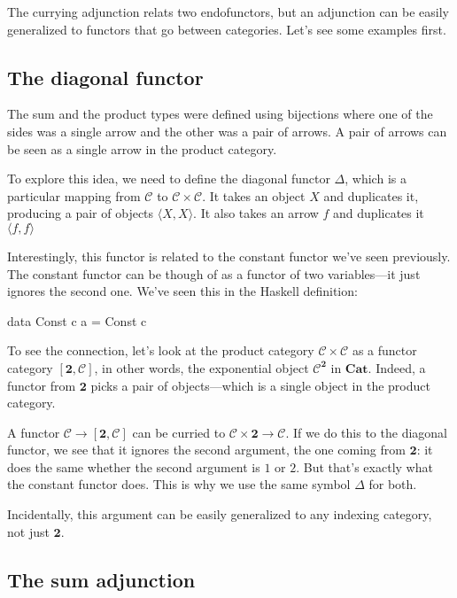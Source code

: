 \documentclass[DaoFP]{subfiles}
\begin{document}
The currying adjunction relats two endofunctors, but an adjunction can be easily generalized to functors that go between categories. Let's see some examples first.

\subsection{The diagonal functor}

The sum and the product types were defined using bijections where one of the sides was a single arrow and the other was a pair of arrows. A pair of arrows can be seen as a single arrow in the product category. 

To explore this idea, we need to define the diagonal functor $\Delta$, which is a particular mapping from $\mathcal{C}$ to $\mathcal{C} \times \mathcal{C}$. It takes an object $X$ and duplicates it, producing a pair of objects $\langle X, X \rangle$. It also takes an arrow $f$ and duplicates it $\langle f, f \rangle$

Interestingly, this functor is related to the constant functor we've seen previously. The constant functor can be though of as a functor of two variables---it just ignores the second one. We've seen this in the Haskell definition:
\begin{haskell}
data Const c a = Const c
\end{haskell}

To see the connection, let's look at the product category $\mathcal{C} \times \mathcal{C}$ as a functor category $[ \mathbf{2}, \mathcal{C}]$, in other words, the exponential object $\mathcal{C}^{ \mathbf{2}}$ in $\mathbf{Cat}$. Indeed, a functor from $\mathbf{2}$ picks a pair of objects---which is a single object in the product category.


A functor $\mathcal{C} \to [\mathbf{2}, \mathcal{C}]$ can be curried to $\mathcal{C} \times \mathbf{2} \to  \mathcal{C}$. If we do this to the diagonal functor, we see that it ignores the second argument, the one coming from $\mathbf{2}$: it does the same whether the second argument is $1$ or $2$. But that's exactly what the constant functor does. This is why we use the same symbol $\Delta$ for both.

Incidentally, this argument can be easily generalized to any indexing category, not just $\mathbf{2}$.

\subsection{The sum adjunction}
\end{document}

